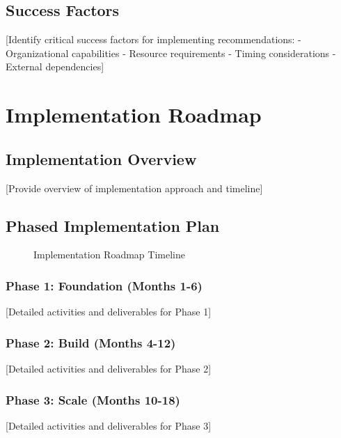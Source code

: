 \documentclass[11pt,letterpaper]{report}
\begin{document}
\section{Success Factors}

[Identify critical success factors for implementing recommendations:
- Organizational capabilities
- Resource requirements
- Timing considerations
- External dependencies]

\chapter{Implementation Roadmap}

\section{Implementation Overview}

[Provide overview of implementation approach and timeline]

\section{Phased Implementation Plan}


\begin{figure}[htbp]
\centering
\caption{Implementation Roadmap Timeline}
\label{fig:implementation}
\end{figure}

\subsection{Phase 1: Foundation (Months 1-6)}
[Detailed activities and deliverables for Phase 1]

\subsection{Phase 2: Build (Months 4-12)}
[Detailed activities and deliverables for Phase 2]

\subsection{Phase 3: Scale (Months 10-18)}
[Detailed activities and deliverables for Phase 3]
\end{document}

